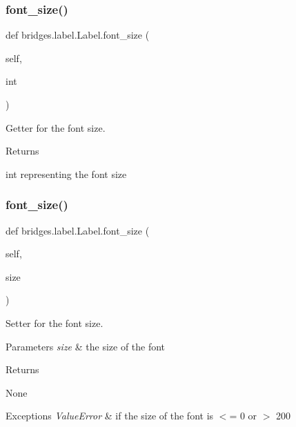 \subsubsection{\texorpdfstring{font\+\_\+size()}{font\_size()}\hspace{0.1cm}{\footnotesize\ttfamily [1/2]}}
{\footnotesize\ttfamily def bridges.\+label.\+Label.\+font\+\_\+size (\begin{DoxyParamCaption}\item[{}]{self,  }\item[{}]{int }\end{DoxyParamCaption})}



Getter for the font size. 

\begin{DoxyReturn}{Returns}


int representing the font size 
\end{DoxyReturn}
\mbox{\label{classbridges_1_1label_1_1_label_a3fc6397d7cfda34ed315545f838f7470}} 
\subsubsection{\texorpdfstring{font\+\_\+size()}{font\_size()}\hspace{0.1cm}{\footnotesize\ttfamily [2/2]}}
{\footnotesize\ttfamily def bridges.\+label.\+Label.\+font\+\_\+size (\begin{DoxyParamCaption}\item[{}]{self,  }\item[{}]{size }\end{DoxyParamCaption})}



Setter for the font size. 


\begin{DoxyParams}{Parameters}
{\em size} & the size of the font \\
\hline
\end{DoxyParams}
\begin{DoxyReturn}{Returns}


None
\end{DoxyReturn}

\begin{DoxyExceptions}{Exceptions}
{\em Value\+Error} & if the size of the font is $<$= 0 or $>$ 200 \\
\hline
\end{DoxyExceptions}
\mbox{\label{classbridges_1_1label_1_1_label_a627bc596c7e3db837e3b1575282e1b98}} 
